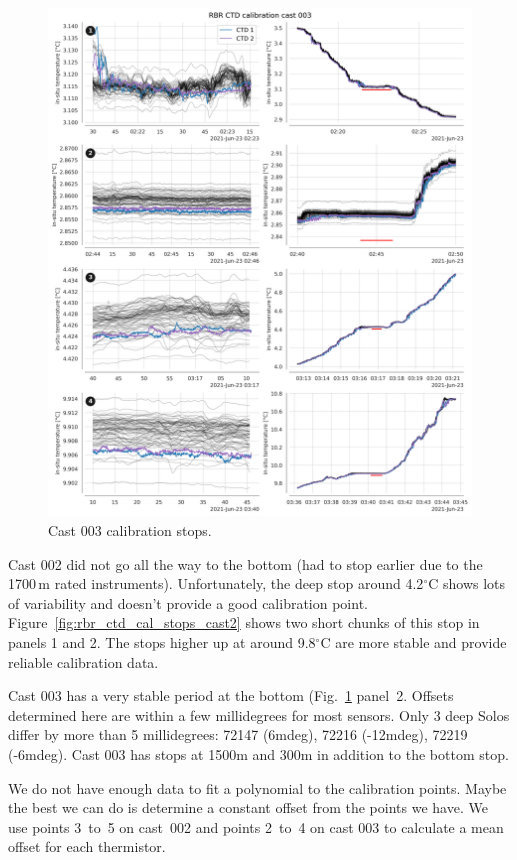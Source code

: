 \documentclass[10pt,letterpaper]{article}
\begin{document}
\begin{figure}[htpb]
    \centering
    \includegraphics[width=0.9\linewidth]{fig/blt1_rbr_ctd_cal_cast_003_stops.png}
    \caption{Cast 003 calibration stops.}%
    \label{fig:rbr_ctd_cal_stops_cast3}
\end{figure}

Cast 002 did not go all the way to the bottom (had to stop earlier due to the 1700\,m rated instruments). Unfortunately, the deep stop around 4.2$^{\circ}$C shows lots of variability and doesn't provide a good calibration point. Figure~\ref{fig:rbr_ctd_cal_stops_cast2} shows two short chunks of this stop in panels 1 and 2. The stops higher up at around 9.8$^{\circ}$C are more stable and provide reliable calibration data.

Cast 003 has a very stable period at the bottom (Fig.~\ref{fig:rbr_ctd_cal_stops_cast3} panel~2. Offsets determined here are within a few millidegrees for most sensors. Only 3 deep Solos differ by more than 5 millidegrees: 72147 (6mdeg), 72216 (-12mdeg), 72219 (-6mdeg). Cast 003 has stops at 1500m and 300m in addition to the bottom stop.

We do not have enough data to fit a polynomial to the calibration points. Maybe the best we can do is determine a constant offset from the points we have. We use points 3~to~5 on cast~002 and points 2~to~4 on cast 003 to calculate a mean offset for each thermistor.
\end{document}
